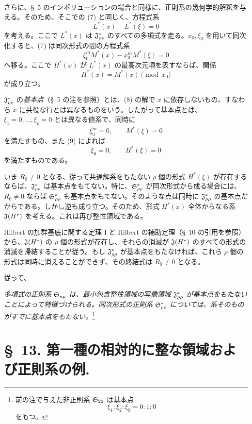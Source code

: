 \documentclass[11pt]{jlreq}
\begin{document}
さらに、\S\ 5 のインボリューションの場合と同様に、正則系の幾何学的解釈を与える。そのため、そこでの (7) と同じく、方程式系
\begin{equation}
  L^*(x)-L^*(\xi)=0
\tag{7}
\end{equation}
を考える。ここで $L^*(x)$ は $\mathfrak{J}^*_{\rho\rho}$ のすべての多項式を走る。$x_0,\xi_0$ を用いて同次化すると、(7) は同次形式の間の方程式系
\begin{equation}
  \xi_0^{m}M^*(x)-x_0^{m}M^*(\xi)=0
\tag{8}
\end{equation}
へ移る。ここで $H^*(x)$ が $L^*(x)$ の最高次元項を表すならば、関係
\begin{equation}
  H^*(x)=M^*(x)\pmod{x_0}
\tag{9}
\end{equation}
が成り立つ。

$\mathfrak{J}^*_{\rho\rho}$ の\emph{基本点}（\S\ 5 の注を参照）とは、(8) の解で $x$ に依存しないもの、すなわち $x$ に共役な行とは異なるものをいう。したがって基本点とは、$\xi_1=0,\ldots,\xi_\rho=0$ とは異なる値系で、同時に
\[
  \xi_0^m=0,
  \qquad M^*(\xi)=0
\]
を満たすもの、また (9) によれば
\[
  \xi_0=0,
  \qquad H^*(\xi)=0
\]
を満たすものである。

いま $R_0\ne0$ となる、従って共通解系をもたない $\rho$ 個の形式 $H^*(\xi)$ が存在するならば、$\mathfrak{J}^*_{\rho\rho}$ は基本点をもてない。特に、$\mathfrak{S}^*_{\rho\rho}$ が同次形式から成る場合には、$R_0\ne0$ ならば $\mathfrak{S}^*_{\rho\rho}$ も基本点をもてない。そのような点は同時に $\mathfrak{J}^*_{\rho\rho}$ の基本点だからである。しかし逆も成り立つ。そのため、形式 $H^*(x)$ 全体からなる系 $\mathfrak{J}(H^*)$ を考える。これは再び整性領域である。

Hilbert の加群基底に関する定理 I と Hilbert の補助定理（\S\ 10 の引用を参照）から、$\mathfrak{J}(H^*)$ の $\rho$ 個の形式が存在し、それらの消滅が $\mathfrak{J}(H^*)$ のすべての形式の消滅を帰結することが従う。もし $\mathfrak{J}^*_{\rho\rho}$ が基本点をもたなければ、これら $\rho$ 個の形式は同時に消えることができず、その終結式は $R_0\ne0$ となる。

従って、

\emph{多項式の正則系 $\mathfrak{S}_{n\rho}$ は、最小包含整性領域の写像領域 $\mathfrak{J}^*_{\rho\rho}$ が基本点をもたないことによって特徴づけられる。同次形式の正則系 $\mathfrak{S}^*_{\rho\rho}$ については、系そのものがすでに基本点をもたない。}\footnote{前の注で与えた非正則系 $\mathfrak{S}_{22}$ は基本点
\[
  \xi_1:\xi_2:\xi_0=0:1:0
\]
をもつ。}

\section*{\S\ 13. 第一種の相対的に整な領域および正則系の例.}
\end{document}
